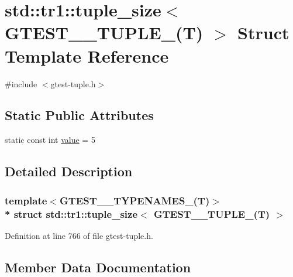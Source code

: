 \hypertarget{structstd_1_1tr1_1_1tuple__size_3_01_g_t_e_s_t__5___t_u_p_l_e___07_t_08_01_4}{}\section{std\+:\+:tr1\+:\+:tuple\+\_\+size$<$ G\+T\+E\+S\+T\+\_\+\_\+\+T\+U\+P\+L\+E\+\_\+(T) $>$ Struct Template Reference}
\label{structstd_1_1tr1_1_1tuple__size_3_01_g_t_e_s_t__5___t_u_p_l_e___07_t_08_01_4}


{\ttfamily \#include $<$gtest-\/tuple.\+h$>$}

\subsection*{Static Public Attributes}
\begin{DoxyCompactItemize}
\item 
static const int \hyperlink{structstd_1_1tr1_1_1tuple__size_3_01_g_t_e_s_t__5___t_u_p_l_e___07_t_08_01_4_a83d207f8b8e95d9b747a586550feefcb}{value} = 5
\end{DoxyCompactItemize}


\subsection{Detailed Description}
\subsubsection*{template$<$G\+T\+E\+S\+T\+\_\+\_\+\+T\+Y\+P\+E\+N\+A\+M\+E\+S\+\_\+(\+T)$>$\\*
struct std\+::tr1\+::tuple\+\_\+size$<$ G\+T\+E\+S\+T\+\_\+\_\+\+T\+U\+P\+L\+E\+\_\+(\+T) $>$}



Definition at line 766 of file gtest-\/tuple.\+h.



\subsection{Member Data Documentation}
